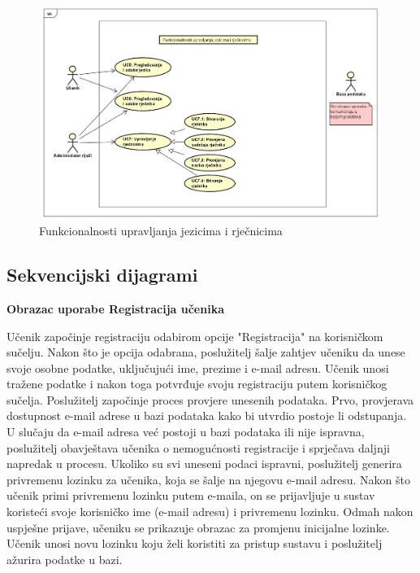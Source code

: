 \begin{figure}[H]
	\includegraphics[scale=0.34]{dijagrami/dijagram3.jpg} 
	\centering
	\caption{Funkcionalnosti upravljanja jezicima i rječnicima}
	\label{fig:dijagram3}
\end{figure}	

\subsection{Sekvencijski dijagrami}

\textbf{{Obrazac uporabe Registracija učenika}}


Učenik započinje registraciju odabirom opcije "Registracija" na korisničkom sučelju. Nakon što je opcija odabrana, poslužitelj šalje zahtjev učeniku da unese svoje osobne podatke, uključujući ime, prezime i e-mail adresu. Učenik unosi tražene podatke i nakon toga potvrđuje svoju registraciju putem korisničkog sučelja. Poslužitelj započinje proces provjere unesenih podataka. Prvo, provjerava dostupnost e-mail adrese u bazi podataka kako bi utvrdio postoje li odstupanja. U slučaju da e-mail adresa već postoji u bazi podataka ili nije ispravna, poslužitelj obavještava učenika o nemogućnosti registracije i sprječava daljnji napredak u procesu. Ukoliko su svi uneseni podaci ispravni, poslužitelj generira privremenu lozinku za učenika, koja se šalje na njegovu e-mail adresu. Nakon što učenik primi privremenu lozinku putem e-maila, on se prijavljuje u sustav koristeći svoje korisničko ime (e-mail adresu) i privremenu lozinku. Odmah nakon uspješne prijave, učeniku se prikazuje obrazac za promjenu inicijalne lozinke. Učenik unosi novu lozinku koju želi koristiti za pristup sustavu i poslužitelj ažurira podatke u bazi.

